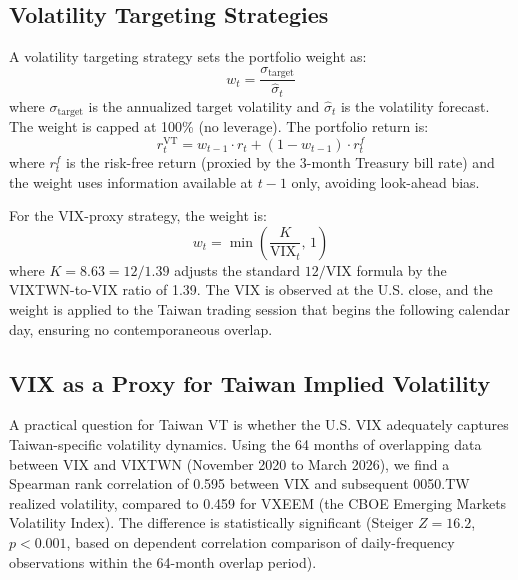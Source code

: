 \subsection{Volatility Targeting Strategies}

A volatility targeting strategy sets the portfolio weight as:
\begin{equation}
w_t = \frac{\sigma_{\text{target}}}{\hat{\sigma}_t}
\label{eq:vt}
\end{equation}
where $\sigma_{\text{target}}$ is the annualized target volatility and $\hat{\sigma}_t$ is the volatility forecast. The weight is capped at 100\% (no leverage). The portfolio return is:
\begin{equation}
r_t^{\text{VT}} = w_{t-1} \cdot r_t + (1 - w_{t-1}) \cdot r_t^{f}
\label{eq:vt_return}
\end{equation}
where $r_t^{f}$ is the risk-free return (proxied by the 3-month Treasury bill rate) and the weight uses information available at $t-1$ only, avoiding look-ahead bias.

For the VIX-proxy strategy, the weight is:
\begin{equation}
w_t = \min\!\left(\frac{K}{\text{VIX}_t}, \, 1\right)
\label{eq:vix_vt}
\end{equation}
where $K = 8.63 = 12 / 1.39$ adjusts the standard $12/\text{VIX}$ formula \citep{bozovic2024} by the VIXTWN-to-VIX ratio of 1.39. The VIX is observed at the U.S. close, and the weight is applied to the Taiwan trading session that begins the following calendar day, ensuring no contemporaneous overlap.

\subsection{VIX as a Proxy for Taiwan Implied Volatility}

A practical question for Taiwan VT is whether the U.S. VIX adequately captures Taiwan-specific volatility dynamics. Using the 64 months of overlapping data between VIX and VIXTWN (November 2020 to March 2026), we find a Spearman rank correlation of 0.595 between VIX and subsequent 0050.TW realized volatility, compared to 0.459 for VXEEM (the CBOE Emerging Markets Volatility Index). The difference is statistically significant (Steiger $Z = 16.2$, $p < 0.001$, based on dependent correlation comparison of daily-frequency observations within the 64-month overlap period).%

